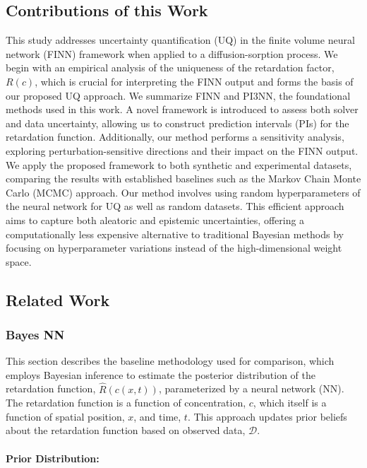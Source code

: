 \documentclass{article}
\begin{document}
\subsection{Contributions of this Work}
This study addresses uncertainty quantification (UQ) in the finite volume neural network (FINN) framework when applied to a diffusion-sorption process. We begin with an empirical analysis of the uniqueness of the retardation factor, $R(c)$, which is crucial for interpreting the FINN output and forms the basis of our proposed UQ approach. We summarize FINN and PI3NN, the foundational methods used in this work. A novel framework is introduced to assess both solver and data uncertainty, allowing us to construct prediction intervals (PIs) for the retardation function. Additionally, our method performs a sensitivity analysis, exploring perturbation-sensitive directions and their impact on the FINN output. We apply the proposed framework to both synthetic and experimental datasets, comparing the results with established baselines such as the Markov Chain Monte Carlo (MCMC) approach. Our method involves using random hyperparameters of the neural network for UQ as well as random datasets. This efficient approach aims to capture both aleatoric and epistemic uncertainties, offering a computationally less expensive alternative to traditional Bayesian methods by focusing on hyperparameter variations instead of the high-dimensional weight space. %


\subsection{Related Work}
\subsubsection{Bayes NN}
\label{sec:bayes_nn}
This section describes the baseline methodology used for comparison, which employs Bayesian inference to estimate the posterior distribution of the retardation function, $\hat{R}(c(x,t))$, parameterized by a neural network (NN). The retardation function is a function of concentration, $c$, which itself is a function of spatial position, $x$, and time, $t$. This approach updates prior beliefs about the retardation function based on observed data, $\mathcal{D}$.

\paragraph{Prior Distribution:}
\end{document}
